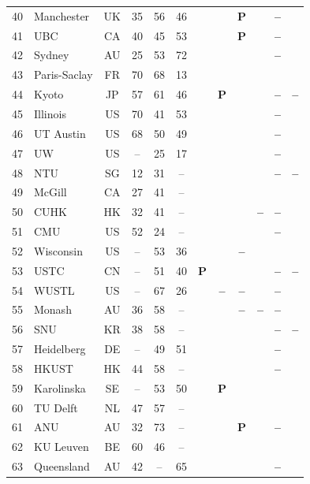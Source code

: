 \documentclass[pdflatex,sn-basic,Numbered]{sn-jnl}
\newcommand{\si}{\ding{51}}
\newcommand{\no}{\textcolor{gris}{\textbf{--}}}
\newcommand{\pc}{\textbf{P}}
\theoremstyle{thmstyleone}
\theoremstyle{thmstyletwo}
\theoremstyle{thmstylethree}
\begin{document}
\begin{appendices}
\begin{longtable}{@{}r l c c c c c c c c c c@{}}
	40 & Manchester & UK & 35 & 56 & 46 & \si & \si & \pc & \si & \no & \si \\
	41 & UBC & CA & 40 & 45 & 53 & \si & \si & \pc & \si & \no & \si \\
	42 & Sydney & AU & 25 & 53 & 72 & \si & \si & \si & \si & \no & \si \\
	43 & Paris-Saclay & FR & 70 & 68 & 13 & \si & \si & \si & \si & \si & \si \\
	44 & Kyoto & JP & 57 & 61 & 46 & \si & \pc & \si & \si & \no & \no \\
	45 & Illinois & US & 70 & 41 & 53 & \si & \si & \si & \si & \no & \si \\
	46 & UT Austin & US & 68 & 50 & 49 & \si & \si & \si & \si & \no & \si \\
	47 & UW & US & -- & 25 & 17 & \si & \si & \si & \si & \no & \si \\
	48 & NTU & SG & 12 & 31 & -- & \si & \si & \si & \si & \no & \no \\
	49 & McGill & CA & 27 & 41 & -- & \si & \si & \si & \si & \si & \si \\
	50 & CUHK & HK & 32 & 41 & -- & \si & \si & \si & \no & \no & \si \\
	51 & CMU & US & 52 & 24 & -- & \si & \si & \si & \si & \no & \si \\
	52 & Wisconsin & US & -- & 53 & 36 & \si & \si & \no & \si & \si & \si \\
	53 & USTC & CN & -- & 51 & 40 & \pc & \si & \si & \si & \no & \no \\
	54 & WUSTL & US & -- & 67 & 26 & \si & \no & \no & \si & \no & \si \\
	55 & Monash & AU & 36 & 58 & -- & \si & \si & \no & \no & \no & \si \\
	56 & SNU & KR & 38 & 58 & -- & \si & \si & \si & \si & \no & \no \\
	57 & Heidelberg & DE & -- & 49 & 51 & \si & \si & \si & \si & \no & \si \\
	58 & HKUST & HK & 44 & 58 & -- & \si & \si & \si & \si & \no & \si \\
	59 & Karolinska & SE & -- & 53 & 50 & \si & \pc & \si & \si & \si & \si \\
	60 & TU Delft & NL & 47 & 57 & -- & \si & \si & \si & \si & \si & \si \\
	61 & ANU & AU & 32 & 73 & -- & \si & \si & \pc & \si & \no & \si \\
	62 & KU Leuven & BE & 60 & 46 & -- & \si & \si & \si & \si & \si & \si \\
	63 & Queensland & AU & 42 & -- & 65 & \si & \si & \si & \si & \no & \si \\
\end{longtable}
\normalsize


\end{appendices}
\end{document}
